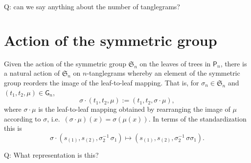 \documentclass{amsart}
\newcommand{\fS}{\mathfrak S}
\newcommand{\pairing}{\mu}
\newcommand{\tangle}{\mathsf{G}}
\newcommand{\ptree}{\mathsf{P}}
\begin{document}
Q: can we say anything about the number of tanglegrams?


\section{Action of the symmetric group}

Given the action of the symmetric group $\fS_n$ on the leaves of trees in $\ptree_n$, there is a natural action of $\fS_n$ on $n$-tanglegrams whereby an element of the symmetric group reorders the image of the leaf-to-leaf mapping.
That is, for $\sigma_n \in \fS_n$ and $(t_1, t_2, \pairing) \in \tangle_n$,
\[
\sigma \cdot (t_1, t_2, \pairing) := (t_1, t_2, \sigma \cdot \pairing),
\]
where $\sigma \cdot \pairing$ is the leaf-to-leaf mapping obtained by rearranging the image of $\pairing$ according to $\sigma$, i.e.\ $(\sigma \cdot \pairing)(x) = \sigma(\pairing(x))$.
In terms of the standardization this is
\[
\sigma \cdot (s_{(1)}, s_{(2)}, \sigma_2^{-1} \, \sigma_1) \mapsto (s_{(1)}, s_{(2)}, \sigma_2^{-1} \, \sigma \sigma_1).
\]

Q: What representation is this?




% 
% 
\end{document}
